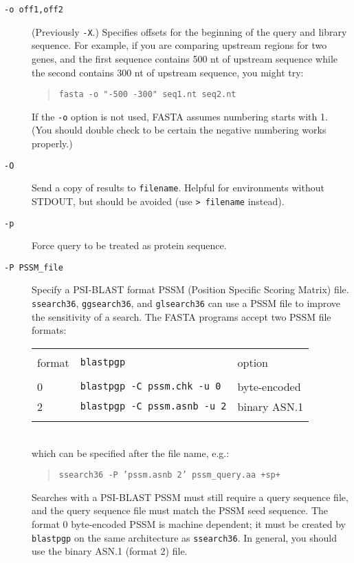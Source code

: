 \documentclass[11pt]{article}
\begin{document}
\begin{description}
\item[\texttt{-o off1,off2}]
(Previously \texttt{-X}.) Specifies offsets for the beginning of the query and library sequence.
For example, if you are comparing upstream regions for two genes, and
the first sequence contains 500 nt of upstream sequence while the
second contains 300 nt of upstream sequence, you might try:
\begin{quote}
\texttt{fasta -o "-500 -300" seq1.nt seq2.nt}
\end{quote}
If the \texttt{-o} option is not used, FASTA assumes numbering starts with 1.
(You should double check to be certain the negative numbering works
properly.)

\item[\texttt{-O}] Send a copy of results to \texttt{filename}.
  Helpful for environments without STDOUT, but should be avoided (use
  \texttt{> filename} instead).

\item[\texttt{-p}]
Force query to be treated as protein sequence.

\item[\texttt{-P PSSM\_file}]
Specify a PSI-BLAST format PSSM (Position Specific Scoring Matrix)
file.  \texttt{ssearch36}, \texttt{ggsearch36}, and
\texttt{glsearch36} can use a PSSM file to improve the sensitivity of
a search. The FASTA programs accept two PSSM file formats:\\[2ex]
\begin{tabular}{l l l}
\hline\\[-1.5ex]
format & \texttt{blastpgp} & option \\[0.5ex]
\hline\\[-1.5ex]
0 & \texttt{blastpgp -C pssm.chk -u 0} & byte-encoded \\
2 & \texttt{blastpgp -C pssm.asnb -u 2} & binary ASN.1 \\
\hline\\[-0.5ex]
\end{tabular}\\
which can be specified after the file name, e.g.:
\begin{quote}
\texttt{ssearch36 -P 'pssm.asnb 2' pssm\_query.aa +sp+}
\end{quote}
Searches with a PSI-BLAST PSSM must still require a query sequence
file, and the query sequence file must match the PSSM seed sequence.
The format 0 byte-encoded PSSM is machine dependent; it must be
created by \texttt{blastpgp} on the same architecture as
\texttt{ssearch36}.  In general, you should use the binary ASN.1 (format 2) file.


\end{description}
\end{document}
